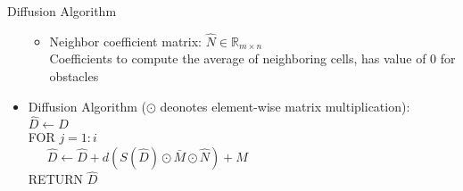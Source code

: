 \documentclass{beamer}
\begin{document}
\begin{frame}{Diffusion Algorithm}
\begin{itemize}
\begin{itemize}
	\item Neighbor coefficient matrix: $\hat N\in \mathbb{R}_{m \times n}$ \\ Coefficients to compute the average of neighboring cells, has value of 0 for obstacles
      \end{itemize}
  \item Diffusion Algorithm ($\odot$ deonotes element-wise matrix multiplication):\\
    $\hat D \leftarrow D$\\
    FOR $j=1:i$\\
    \ \ \ $\hat D \leftarrow \hat D + d (S(\hat D) \odot \bar{M} \odot \hat{N}) + M$ \\
    RETURN $\hat D$
    
   
\end{itemize}
\end{frame}
\end{document}
